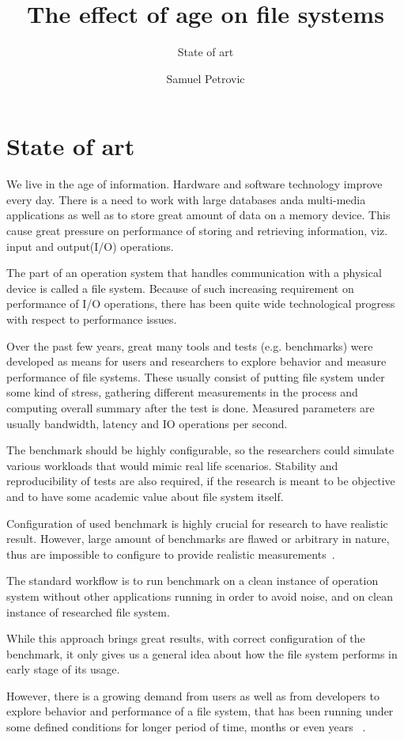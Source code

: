 \documentclass[color]{fithesis3}
\title{The effect of age on file systems}
\subtitle{State of art}
\author{Samuel Petrovic}
\begin{document}
\chapter{State of art}
We live in the age of information. Hardware and software technology improve every day. There is a need to work with large databases anda multi-media applications as well as to store great amount of data on a memory device. This cause great pressure on performance of storing and retrieving information, viz. input and output(I/O) operations.

The part of an operation system that handles communication with a physical device is called a file system. Because of such increasing requirement on performance of I/O operations, there has been quite wide technological progress with respect to performance issues. 

Over the past few years, great many tools and tests (e.g. benchmarks) were developed as means for users and researchers to explore behavior and measure performance of file systems. These usually consist of putting file system under some kind of stress, gathering different measurements in the process and computing overall summary after the test is done. Measured parameters are usually bandwidth, latency and IO operations per second.

The benchmark should be highly configurable, so the researchers could simulate various workloads that would mimic real life scenarios. Stability and reproducibility of tests are also required, if the research is meant to be objective and to have some academic value about file system itself. ~\cite{rocketscience:qhe}

Configuration of used benchmark is highly crucial for research to have realistic result. However, large amount of benchmarks are flawed or arbitrary in nature, thus are impossible to configure to provide realistic measurements~\cite{fsbench-article:qhe}.

The standard workflow is to run benchmark on a clean instance of operation system without other applications running in order to avoid noise, and on clean instance of researched file system. 

While this approach brings great results, with correct configuration of the benchmark, it only gives us a general idea about how the file system performs in early stage of its usage. 

However, there is a growing demand from users as well as from developers to explore behavior and performance of a file system, that has been running under some defined conditions for longer period of time, months or even years ~\cite{harvardaging:qhe}.
\end{document}
